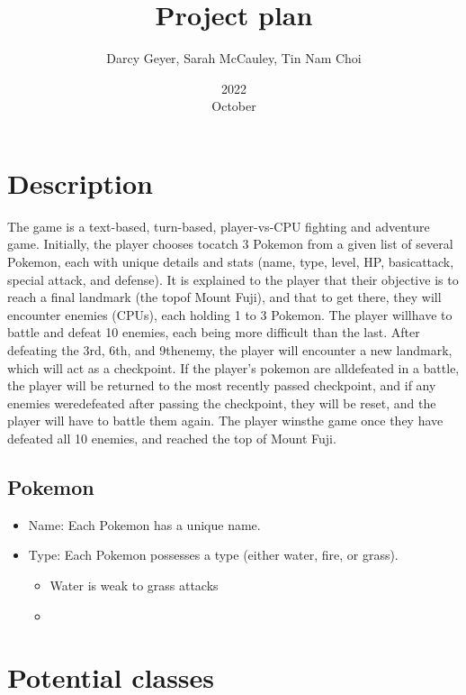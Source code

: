 \documentclass{article}
\title{Project plan}
\author{Darcy Geyer, Sarah McCauley, Tin Nam Choi}
\date{2022\\October}
\begin{document}
  \maketitle{}
  
  \tableofcontents{}
  \setlength{\parindent}{0em}
  \setlength{\parskip}{1em}
  
  \pagebreak
  
  \section{Description}
  The game is a text-based, turn-based, player-vs-CPU fighting and adventure game. Initially, the player chooses tocatch 3 Pokemon from a given list of several Pokemon, each with unique details and stats (name, type, level, HP, basicattack, special attack, and defense). It is explained to the player that their objective is to reach a final landmark (the topof Mount Fuji), and that to get there, they will encounter enemies (CPUs), each holding 1 to 3 Pokemon. The player willhave to battle and defeat 10 enemies, each being more difficult than the last. After defeating the 3rd, 6th, and 9thenemy, the player will encounter a new landmark, which will act as a checkpoint. If the player’s pokemon are alldefeated in a battle, the player will be returned to the most recently passed checkpoint, and if any enemies weredefeated after passing the checkpoint, they will be reset, and the player will have to battle them again. The player winsthe game once they have defeated all 10 enemies, and reached the top of Mount Fuji.
  
  \subsection{Pokemon}
  \begin{itemize}
    \item Name: Each Pokemon has a unique name. 
    \item Type: Each Pokemon possesses a type (either water, fire, or grass).
      \begin{itemize}
        \item Water is weak to grass attacks
        \item 
      \end{itemize}
  \end{itemize}
  
  \pagebreak

  \section{Potential classes}
  
\end{document}
